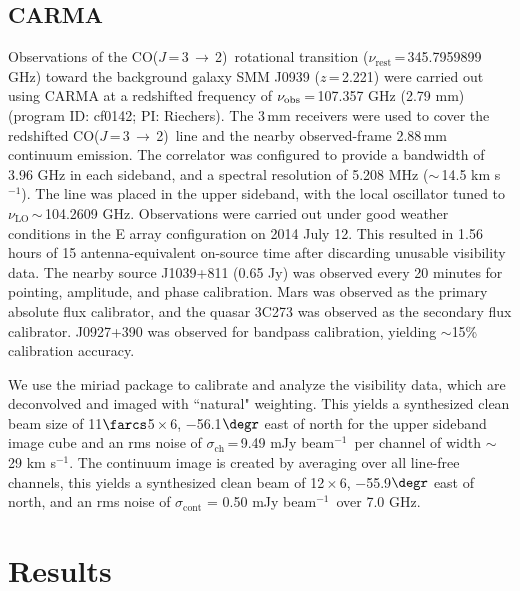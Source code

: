 \documentclass[twocolumn,apj,numberedappendix]{emulateapj}
\newcommand{\CO}{\mbox{CO($J$\,=\,3\,$\rightarrow$\,2) }}
\newcommand{\pmOne}{\mbox{$^{-1}$}}
\begin{document}
\subsection{CARMA} \label{sec:carmadata}
Observations of the \CO rotational transition ($\nu_\textrm{rest}$\,=\,345.7959899 GHz) toward the background galaxy SMM
J0939 ($z$\,=\,2.221) were carried out using CARMA at a redshifted frequency of $\nu_{\rm obs}$\,=\,107.357\,\,GHz (2.79\,\,mm)  (program ID: cf0142; PI: Riechers). The 3\,mm receivers were used to cover the redshifted \CO line and the nearby observed-frame 2.88\,mm continuum emission. The correlator was configured to provide a bandwidth of 3.96 GHz in each sideband, and a spectral resolution of 5.208 MHz ($\sim$\,14.5 km\,\,s\pmOne). 
The line was placed in the
upper sideband, with the local oscillator tuned to $\nu_\textrm{LO}$\,$\sim$\,104.2609 GHz. %
Observations were carried out under good
weather conditions in the E array configuration on 2014 July 12. This resulted in 1.56 hours of 15 antenna-equivalent on-source time after discarding unusable visibility data.
The nearby source J1039+811 (0.65\,\,Jy) was observed every 20 minutes for
pointing, amplitude, and phase calibration. Mars was observed as the primary
absolute flux calibrator, and the quasar 3C273 was observed as the secondary
flux calibrator. J0927+390 was observed for bandpass calibration, yielding $\sim
$15\% calibration accuracy. \par
We use the {\sc miriad} package to calibrate and analyze the visibility data, which are deconvolved and imaged with ``natural" weighting.
This yields a synthesized clean beam size of 11$\farcs$5\,$\times$\,6, $-$56.1$\degr$ east of north for the upper sideband image cube and an rms noise of $\sigma_\textrm{ch}$\,=\,9.49\,\,mJy\,\,beam\pmOne\ per channel
of width $\sim$\,29 km\,\,s\pmOne.
The continuum image is created by
averaging over all line-free channels, this yields a synthesized clean beam of 12\,$\times$\,6, $-$55.9$\degr$ east of north, and an rms noise of $\sigma_\textrm{cont}$ = 0.50\,\,mJy\,\,beam\pmOne\ over 7.0 GHz.
\section{Results}\label{sec:res}
\end{document}
